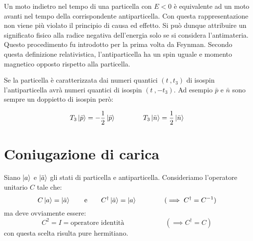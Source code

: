 Un moto indietro nel tempo di una particella con $E < 0$ è equivalente ad un
moto avanti nel tempo della corrispondente antiparticella. Con questa
rappresentazione non viene più violato il principio di causa ed effetto. Si 
può
dunque attribuire un significato fisico alla radice negativa dell'energia solo
se si considera l'antimateria. Questo procedimento fu introdotto per la prima
volta da Feynman. Secondo questa definizione relativistica, l'antiparticella ha
un spin uguale e momento magnetico opposto rispetto alla particella.

Se la particella è caratterizzata dai numeri quantici $( t \ , t_3)$ di isospin
l'antiparticella avrà numeri quantici di isospin $(t \ , - t_3)$.
Ad esempio $\bar{p}$ e $\bar{n}$ sono sempre un doppietto di isospin però:
 
 \begin{equation*}
 T_3 \Ket{\bar{p}} = -\dfrac{1}{2} \Ket{\bar{p}} \qquad \qquad T_3 
\Ket{\bar{n}} = \dfrac{1}{2} \Ket{\bar{n}}
 \end{equation*}

\chapter{Coniugazione di carica}

Siano $\Ket{a}$ e $\Ket{\bar{a}}$ gli stati di particella 
e antiparticella.
Consideriamo l'operatore unitario $C$ tale che:
\begin{equation*}
C\Ket{a} = \Ket{\bar{a}} \qquad \text{e} \qquad C^\dag \Ket{\bar{a}} = \Ket{a}
\qquad \qquad (\implies C^\dag = C^{-1})
\end{equation*}
ma deve ovviamente essere:
\begin{equation*}
C^2 = I = \text{operatore identità} \qquad \qquad \qquad (\implies C^\dag = C)
\end{equation*}
con questa scelta risulta pure hermitiano. 

